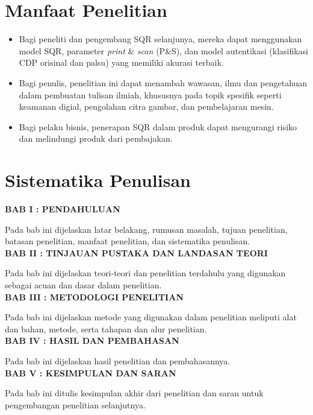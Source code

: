 \section{Manfaat Penelitian}
\begin{itemize}
      \item Bagi peneliti dan pengembang SQR selanjunya, mereka dapat menggunakan model SQR, parameter \emph{print} \& \emph{scan} (P\&S), dan model autentikasi
            (klasifikasi CDP orisinal dan palsu) yang memiliki akurasi terbaik.
      \item Bagi penulis, penelitian ini dapat menambah wawasan, ilmu dan pengetahuan dalam pembuatan tulisan ilmiah, khususnya pada topik spesifik seperti keamanan
            digial, pengolahan citra gambar, dan pembelajaran mesin.
      \item Bagi pelaku bisnis, penerapan SQR dalam produk dapat mengurangi risiko dan melindungi produk dari pembajakan.
\end{itemize}

\section{Sistematika Penulisan}
\noindent
\textbf{BAB I : PENDAHULUAN}

\noindent Pada bab ini dijelaskan latar belakang, rumusan masalah, tujuan penelitian, batasan penelitian, manfaat penelitian, dan sistematika penulisan.\\

\noindent
\textbf{BAB II : TINJAUAN PUSTAKA DAN LANDASAN TEORI}

\noindent Pada bab ini dijelaskan teori-teori dan penelitian terdahulu yang digunakan sebagai acuan dan dasar dalam penelitian.\\

\noindent
\textbf{BAB III : METODOLOGI PENELITIAN}

\noindent Pada bab ini dijelaskan metode yang digunakan dalam penelitian meliputi alat dan bahan, metode, serta tahapan dan alur penelitian.\\

\noindent
\textbf{BAB IV : HASIL DAN PEMBAHASAN}

\noindent Pada bab ini dijelaskan hasil penelitian dan pembahasannya.\\

\noindent
\textbf{BAB V : KESIMPULAN DAN SARAN}

\noindent Pada bab ini ditulis kesimpulan akhir dari penelitian dan saran untuk pengembangan penelitian selanjutnya.\\